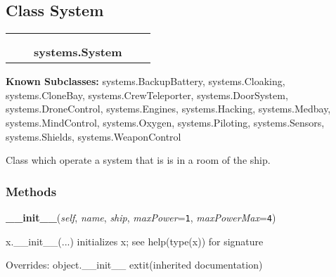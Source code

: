 \subsection{Class System}

    \label{systems:System}
\begin{tabular}{cccccc}
\multicolumn{2}{r}{\settowidth{\BCL}{object}\multirow{2}{\BCL}{object}}
&&
  \\\cline{3-3}
  &&\multicolumn{1}{c|}{}
&&
  \\
&&\multicolumn{2}{l}{\textbf{systems.System}}
\end{tabular}

\textbf{Known Subclasses:}
systems.BackupBattery,
    systems.Cloaking,
    systems.CloneBay,
    systems.CrewTeleporter,
    systems.DoorSystem,
    systems.DroneControl,
    systems.Engines,
    systems.Hacking,
    systems.Medbay,
    systems.MindControl,
    systems.Oxygen,
    systems.Piloting,
    systems.Sensors,
    systems.Shields,
    systems.WeaponControl

Class which operate a system that is is in a room of the ship.



  \subsubsection{Methods}

    \vspace{0.5ex}

\hspace{.8\funcindent}\begin{boxedminipage}{\funcwidth}

    \raggedright \textbf{\_\_init\_\_}(\textit{self}, \textit{name}, \textit{ship}, \textit{maxPower}={\tt 1}, \textit{maxPowerMax}={\tt 4})

\setlength{\parskip}{2ex}
    x.\_\_init\_\_(...) initializes x; see help(type(x)) for signature

\setlength{\parskip}{1ex}
      Overrides: object.\_\_init\_\_ 	extit{(inherited documentation)}

    \end{boxedminipage}

    \vspace{0.5ex}

